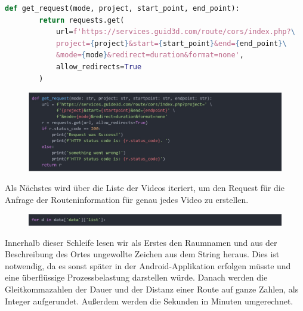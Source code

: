 \begin{lstlisting}[language=Python]
    def get_request(mode, project, start_point, end_point):
        return requests.get(
            url=f'https://services.guid3d.com/route/cors/index.php?\
            project={project}&start={start_point}&end={end_point}\
            &mode={mode}&redirect=duration&format=none',
            allow_redirects=True
        )
\end{lstlisting}
\begin{figure}[H]
    \includegraphics[width=\textwidth]{Figures/3DNavigator/code06.jpg}
    \centering
\end{figure} \vspace{-3.5mm}

Als Nächstes wird über die Liste der Videos iteriert, um den Request für die Anfrage der Routeninformation für genau jedes Video zu erstellen.

\begin{figure}[H]
    \includegraphics[width=\textwidth]{Figures/3DNavigator/code07.jpg}
    \centering
\end{figure} \vspace{-3.5mm}

Innerhalb dieser Schleife lesen wir als Erstes den Raumnamen und aus der Beschreibung des Ortes ungewollte Zeichen aus dem String heraus. Dies ist notwendig, da es sonst später in der Android-Applikation erfolgen müsste und eine überflüssige Prozessbelastung darstellen würde. Danach werden die Gleitkommazahlen der Dauer und der Distanz einer Route auf ganze Zahlen, als Integer aufgerundet. Außerdem werden die Sekunden in Minuten umgerechnet.


